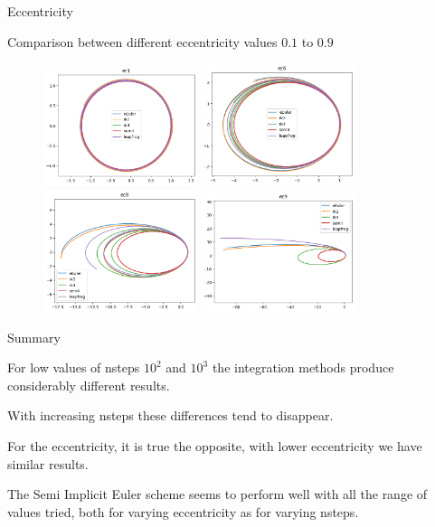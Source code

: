 \documentclass{beamer}
\begin{document}
\begin{frame}{Eccentricity}

	Comparison between different eccentricity values $0.1$ to $0.9$

\begin{figure}
\centering
    \includegraphics[width=0.4\textwidth]{plots/ec1_plot.png}
    \includegraphics[width=0.4\textwidth]{plots/ec6_plot.png}
    \includegraphics[width=0.4\textwidth]{plots/ec8_plot.png}
    \includegraphics[width=0.4\textwidth]{plots/ec9_plot.png}
    \label{fig:question}
\end{figure}
\end{frame}
\begin{frame}{Summary}

For low values of nsteps $10^2$ and $10^3$ the integration methods produce considerably different results. \bigskip

With increasing nsteps these differences tend to disappear. \bigskip

For the eccentricity, it is true the opposite, with lower eccentricity we have similar results.\bigskip

The Semi Implicit Euler scheme seems to perform well with all the range of values tried, both for varying eccentricity as for varying nsteps.

\end{frame}
\end{document}
